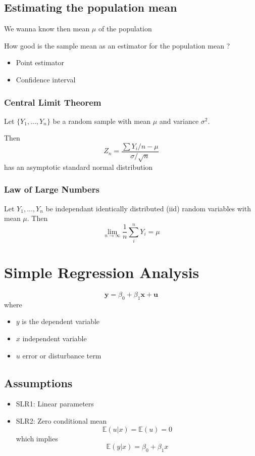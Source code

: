 \documentclass[a4paper,titlepage] {scrartcl}
\begin{document}
\subsection{Estimating the population mean}
We wanna know then mean $\mu$ of the population

How good is the sample mean as an estimator for the population mean ?
\begin{itemize}
	\item Point estimator
	\item Confidence interval
\end{itemize}

\subsubsection{Central Limit Theorem}
Let $\{Y_1, ..., Y_n\}$ be a random sample with mean $\mu$ and variance $\sigma^2$.

Then 
\begin{equation}
	Z_n=\frac{\sum Y_i/n-\mu}{\sigma/\sqrt{n}}
\end{equation}
has an asymptotic standard normal distribution


\subsubsection{Law of Large Numbers}
Let $Y_1,...,Y_n$ be independant identically distributed (iid) random variables with mean $\mu$. Then	
\begin{equation}
	\lim_{n\rightarrow\infty}\frac{1}{n}\sum_{i}^nY_i=\mu
\end{equation}


\section{Simple Regression Analysis}
\begin{equation}
	\mathbf{y} = \beta_0+\beta_1\mathbf{x}+\mathbf{u}
\end{equation}
where
\begin{itemize}
	\item $y$ is the dependent variable
	\item $x$ independent variable
	\item $u$ error or disturbance term
\end{itemize}

\subsection{Assumptions}
\begin{itemize}
	\item SLR1: Linear parameters
	\item SLR2: Zero conditional mean
	\begin{equation}
		\mathbb E(u|x)=\mathbb{E}(u)=0
	\end{equation}
	which implies
	\begin{equation}
		\mathbb E(y|x)=\beta_0+\beta_1x
	\end{equation}
\end{itemize}
\end{document}
